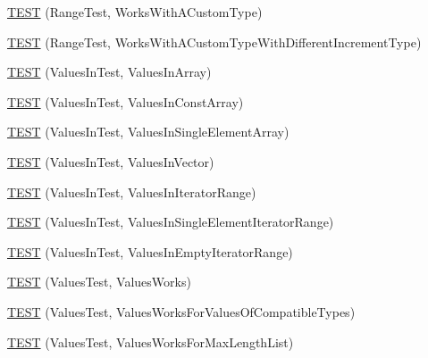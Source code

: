 \begin{DoxyCompactItemize}
\item 
\mbox{\hyperlink{googletest-master_2googletest_2test_2googletest-param-test-test_8cc_ae3c8adabec91bd63fd719e116c279eac}{T\+E\+ST}} (Range\+Test, Works\+With\+A\+Custom\+Type)
\item 
\mbox{\hyperlink{googletest-master_2googletest_2test_2googletest-param-test-test_8cc_a88be7527c7d77f3c89f80d84c80fd405}{T\+E\+ST}} (Range\+Test, Works\+With\+A\+Custom\+Type\+With\+Different\+Increment\+Type)
\item 
\mbox{\hyperlink{googletest-master_2googletest_2test_2googletest-param-test-test_8cc_abfcf3f3f6fcd742e3e85daf552f02b40}{T\+E\+ST}} (Values\+In\+Test, Values\+In\+Array)
\item 
\mbox{\hyperlink{googletest-master_2googletest_2test_2googletest-param-test-test_8cc_aeeb7ce0b55e6d2cfc439149470c7af16}{T\+E\+ST}} (Values\+In\+Test, Values\+In\+Const\+Array)
\item 
\mbox{\hyperlink{googletest-master_2googletest_2test_2googletest-param-test-test_8cc_ada74720d1b4b4c63cf08033f4509561b}{T\+E\+ST}} (Values\+In\+Test, Values\+In\+Single\+Element\+Array)
\item 
\mbox{\hyperlink{googletest-master_2googletest_2test_2googletest-param-test-test_8cc_a562952744cd40b914d6547e83003c257}{T\+E\+ST}} (Values\+In\+Test, Values\+In\+Vector)
\item 
\mbox{\hyperlink{googletest-master_2googletest_2test_2googletest-param-test-test_8cc_a231a43db61584a3f11662bdc78b6cc77}{T\+E\+ST}} (Values\+In\+Test, Values\+In\+Iterator\+Range)
\item 
\mbox{\hyperlink{googletest-master_2googletest_2test_2googletest-param-test-test_8cc_a38f446e378a9ff60bd6a1df2d533a1df}{T\+E\+ST}} (Values\+In\+Test, Values\+In\+Single\+Element\+Iterator\+Range)
\item 
\mbox{\hyperlink{googletest-master_2googletest_2test_2googletest-param-test-test_8cc_aed44e3d25084500088fb9cb99e189939}{T\+E\+ST}} (Values\+In\+Test, Values\+In\+Empty\+Iterator\+Range)
\item 
\mbox{\hyperlink{googletest-master_2googletest_2test_2googletest-param-test-test_8cc_ad859819e6b2a7ec58c4fd509b5cfc26c}{T\+E\+ST}} (Values\+Test, Values\+Works)
\item 
\mbox{\hyperlink{googletest-master_2googletest_2test_2googletest-param-test-test_8cc_a079a199d832d0c61689193e9c9a4fd1a}{T\+E\+ST}} (Values\+Test, Values\+Works\+For\+Values\+Of\+Compatible\+Types)
\item 
\mbox{\hyperlink{googletest-master_2googletest_2test_2googletest-param-test-test_8cc_a5d96d28bb6fd22c56222a4b358a8c65e}{T\+E\+ST}} (Values\+Test, Values\+Works\+For\+Max\+Length\+List)

\end{DoxyCompactItemize}
